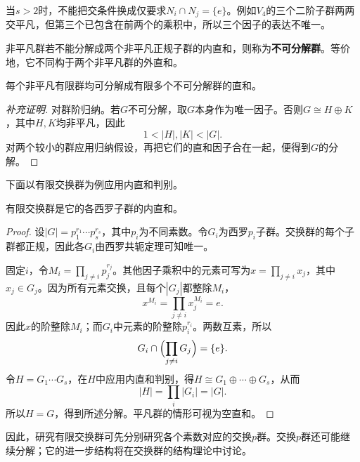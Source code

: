 \begin{remark}
当$s>2$时，不能把交条件换成仅要求$N_i\cap N_j=\{e\}$。例如$V_4$的三个二阶子群两两交平凡，但第三个已包含在前两个的乘积中，所以三个因子的表达不唯一。
\end{remark}

\begin{definition}
非平凡群若不能分解成两个非平凡正规子群的内直和，则称为\textbf{不可分解群}。等价地，它不同构于两个非平凡群的外直和。
\end{definition}

\begin{proposition}
每个非平凡有限群均可分解成有限多个不可分解群的直和。
\end{proposition}
\begin{proof}[补充证明]
对群阶归纳。若$G$不可分解，取$G$本身作为唯一因子。否则$G\cong H\oplus K$，其中$H,K$均非平凡，因此
\[
1<|H|,|K|<|G|.
\]
对两个较小的群应用归纳假设，再把它们的直和因子合在一起，便得到$G$的分解。
\end{proof}

下面以有限交换群为例应用内直和判别。

\begin{theorem}
有限交换群是它的各西罗子群的内直和。
\end{theorem}
\begin{proof}
设$|G|=p_1^{r_1}\cdots p_s^{r_s}$，其中$p_i$为不同素数。令$G_i$为西罗$p_i$子群。交换群的每个子群都正规，因此各$G_i$由西罗共轭定理可知唯一。

固定$i$，令$M_i=\prod_{j\ne i}p_j^{r_j}$。其他因子乘积中的元素可写为$x=\prod_{j\ne i}x_j$，其中$x_j\in G_j$。因为所有元素交换，且每个$|G_j|$都整除$M_i$，
\[
x^{M_i}=\prod_{j\ne i}x_j^{M_i}=e.
\]
因此$x$的阶整除$M_i$；而$G_i$中元素的阶整除$p_i^{r_i}$。两数互素，所以
\[
G_i\cap\Bigl(\prod_{j\ne i}G_j\Bigr)=\{e\}.
\]
令$H=G_1\cdots G_s$，在$H$中应用内直和判别，得$H\cong G_1\oplus\cdots\oplus G_s$，从而
\[
|H|=\prod_i|G_i|=|G|.
\]
所以$H=G$，得到所述分解。平凡群的情形可视为空直和。
\end{proof}

因此，研究有限交换群可先分别研究各个素数对应的交换$p$群。交换$p$群还可能继续分解；它的进一步结构将在交换群的结构理论中讨论。
